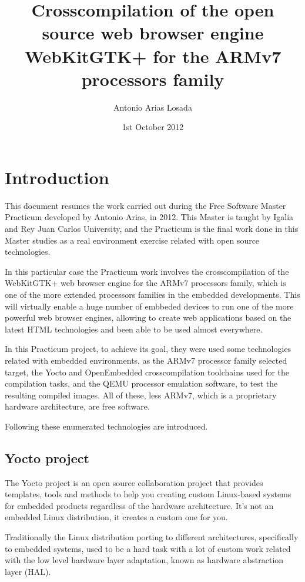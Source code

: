 \documentclass[a4paper,11pt,openany]{report}
\title{Crosscompilation of the open source web browser engine WebKitGTK+ for the ARMv7 processors family}
\author{Antonio Arias Losada}
\date{1st October 2012}
\begin{document}
\maketitle
\tableofcontents

\chapter{Introduction}
This document resumes the work carried out during the Free Software Master\cite{master} Practicum developed by Antonio Arias, in 2012. This Master is taught by Igalia and Rey Juan Carlos University, and the Practicum is the final work done in this Master studies as a real environment exercise related with open source technologies.

In this particular case the Practicum work involves the crosscompilation of the WebKitGTK+\cite{webkitgtk+} web browser engine for the ARMv7 processors family, which is one of the more extended processors families in the embedded developments. This will virtually enable a huge number of embbeded devices to run one of the more powerful web browser engines, allowing to create web applications based on the latest HTML technologies and been able to be used almost everywhere.

In this Practicum project, to achieve its goal, they were used some technologies related with embedded environments, as the ARMv7 processor family selected target, the Yocto\cite{yocto} and OpenEmbedded\cite{openembedded} crosscompilation toolchains used for the compilation tasks, and the QEMU\cite{qemu} processor emulation software, to test the resulting compiled images. All of these, less ARMv7, which is a proprietary hardware architecture, are free software.

Following these enumerated technologies are introduced.

\section{Yocto project}
The Yocto project is an open source collaboration project that provides templates, tools and methods to help you creating custom Linux-based systems for embedded products regardless of the hardware architecture. It's not an embedded Linux distribution, it creates a custom one for you.

Traditionally the Linux distribution porting to different architectures, specifically to embedded systems, used to be a hard task with a lot of custom work related with the low level hardware layer adaptation, known as hardware abstraction layer (HAL).
\end{document}
